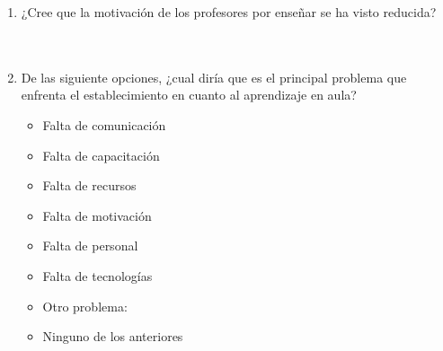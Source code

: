 \documentclass{article}
\begin{document}
\begin{enumerate}
        \underline{\hspace{0.95\linewidth}} \vspace{0.3cm} \\
        \underline{\hspace{0.95\linewidth}} \vspace{0.3cm} \\
        \underline{\hspace{0.95\linewidth}} \vspace{0.3cm}
    \item ¿Cree que la motivación de los profesores por enseñar se ha visto reducida?\\[0.5cm]
        \underline{\hspace{0.95\linewidth}} \vspace{0.3cm} \\
        \underline{\hspace{0.95\linewidth}} \vspace{0.3cm} \\
        \underline{\hspace{0.95\linewidth}} \vspace{0.3cm}
    \item De las siguiente opciones, ¿cual diría que es el principal problema que enfrenta el establecimiento en cuanto al aprendizaje en aula? 
    \begin{itemize}[label=$\square$]
        \item Falta de comunicación
        \item Falta de capacitación
        \item Falta de recursos
        \item Falta de motivación
        \item Falta de personal
        \item Falta de tecnologías
        \item Otro problema: \underline{\hspace{0.5\linewidth}}
        \item Ninguno de los anteriores
    \end{itemize}
\end{enumerate}

\end{document}
